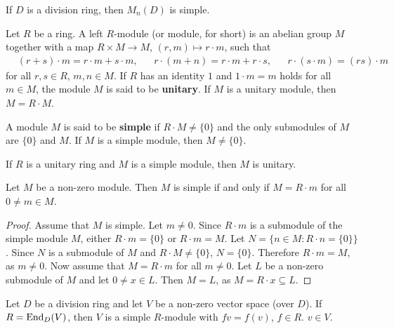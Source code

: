 \begin{example}
	If $D$ is a division ring, then $M_n(D)$ is simple. 
\end{example}

Let $R$ be a ring. A left $R$-module (or module, for short)  
is an abelian group $M$ together with a map $R\times M\to M$, $(r,m)\mapsto r\cdot m$, such that
\begin{align*}
	&(r+s)\cdot m=r\cdot m+s\cdot m, &&
	r\cdot (m+n)=r\cdot m+r\cdot s, && r\cdot (s\cdot m)=(rs)\cdot m    
\end{align*}
for all $r,s\in R$, $m,n\in M$.  If $R$ has an identity 
$1$ and $1\cdot m=m$ holds for all $m\in M$, the module $M$ is said to be 
\textbf{unitary}.  If $M$ is a unitary module, then $M=R\cdot M$. %

\begin{definition}
\label{Module!simple}
    A module $M$ is said to be 
    \textbf{simple} if $R\cdot M\ne\{0\}$ and 
    the only submodules of $M$ are $\{0\}$ and $M$.
    If $M$ is a simple module, then $M\ne\{0\}$.
\end{definition}

If $R$ is a unitary ring and $M$ is a simple 
module, then $M$ is unitary. 


\begin{lemma}
	\label{lemma:simple}
	Let $M$ be a non-zero module. Then $M$ is simple if and only if $M=R\cdot m$
	for all $0\ne m\in M$.
\end{lemma}

\begin{proof}
	Assume that $M$ is simple.  Let $m\ne 0$. Since $R\cdot m$ is a submodule of the simple 
	module $M$, either $R\cdot m=\{0\}$ or $R\cdot m=M$.  Let $N=\{n\in M:R\cdot n=\{0\}\}$. Since $N$ is a 
	submodule of $M$ and $R\cdot M\ne\{0\}$, $N=\{0\}$. Therefore $R\cdot m=M$, as $m\ne0$.
	Now assume that $M=R\cdot m$ for all $m\ne0$. Let $L$ be a non-zero submodule of 
	$M$ and let $0\ne x\in L$. Then $M=L$, as $M=R\cdot x\subseteq L$. 
\end{proof} 

\begin{example}
	Let $D$ be a division ring and let $V$ be a non-zero vector space (over $D$). If 
	$R=\operatorname{End}_D(V)$, then $V$ is a simple $R$-module with $fv=f(v)$, $f\in R$.
	$v\in V$. 
\end{example}

